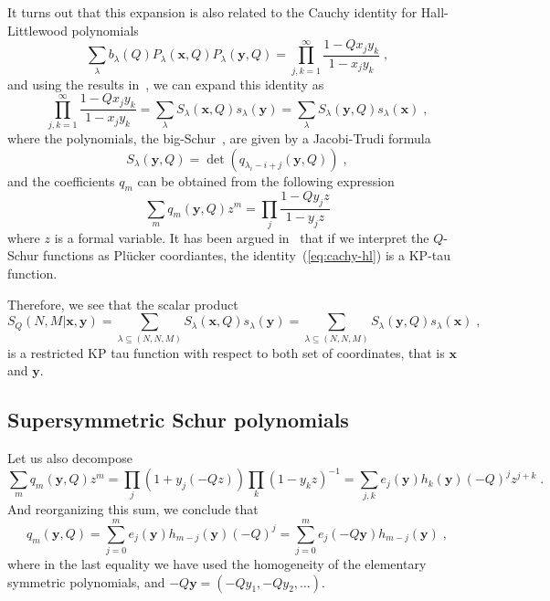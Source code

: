 \documentclass[a4paper,11pt]{amsart}
\begin{document}
It turns out that this expansion is  also related to the Cauchy identity for 
Hall-Littlewood polynomials~\cite{Macdonald:1998}
\begin{equation}
\sum_{\lambda} b_\lambda(Q) P_{\lambda}(\bm{x}, Q) P_{\lambda}(\bm{y}, Q)
= \prod_{j, k=1}^\infty \frac{1-Q x_j y_k}{1 - x_j y_k}\; ,
\end{equation}
and using the results in~\cite[see chap.3, sec. 4, eq. (4.7)]{Macdonald:1998}, 
we can expand this identity as 
\begin{equation}
\label{eq:cachy-hl}
 \prod_{j, k=1}^\infty \frac{1-Q x_j y_k}{1 - x_j y_k} = 
\sum_{\lambda} S_{\lambda}(\bm{x}, Q) s_{\lambda}(\bm{y}) =
\sum_{\lambda} S_{\lambda}(\bm{y}, Q) s_{\lambda}(\bm{x}) \; ,
\end{equation}
where the polynomials, the big-Schur~\cite{Wheeler:2018}, are given by 
a Jacobi-Trudi formula
\begin{equation}
  S_{\lambda} (\bm{y}, Q) = \det(q_{\lambda_i -i + j}(\bm{y}, Q))\; , 
\end{equation}
and the coefficients \(q_m\) can be obtained from the following expression
\begin{equation}
 \sum_{m} q_m(\bm{y}, Q) z^m =
 \prod_{j} \frac{1-Q y_j z}{1 - y_j z}
\end{equation}
where \(z\) is a formal variable. It has been argued
in~\cite{Foda:2008hn} that if we interpret the \(Q\)-Schur functions
as Plücker coordiantes, the identity~(\ref{eq:cachy-hl}) is a KP-tau
function.

Therefore, we see that the scalar product 
\begin{equation}
  S_Q(N,M | \bm{x}, \bm{y})
  = \sum_{\lambda \subseteq (N,N,M)} S_{\lambda}(\bm{x}, Q) s_{\lambda}(\bm{y})
  = \sum_{\lambda \subseteq (N,N,M)} S_{\lambda}(\bm{y}, Q) s_{\lambda}(\bm{x})\; ,
\end{equation}
is a restricted KP tau function with respect to both set of coordinates,
that is \(\bm{x}\) and \(\bm{y}\).


\subsection{Supersymmetric Schur polynomials}

Let us also decompose 
\begin{equation}
 \sum_{m} q_m(\bm{y}, Q) z^m =
 \prod_j (1 + y_j (-Q z)) \prod_k (1 - y_k z)^{-1} = 
 \sum_{j, k} e_j(\bm{y}) h_k(\bm{y}) (- Q)^j z^{j+k}\; .
\end{equation}
And reorganizing this sum, we conclude that 
\begin{equation}
  q_m(\bm{y}, Q)  = \sum_{j=0}^m e_j(\bm{y}) h_{m-j}(\bm{y}) (- Q)^j =
 \sum_{j=0}^m e_j(-Q\bm{y}) h_{m-j}(\bm{y}) \; ,
\end{equation}
where in the last equality we have used the homogeneity of the elementary symmetric polynomials,
and \( -Q\bm{y} = (-Qy_1, -Qy_2, \dots)\). 
\end{document}
